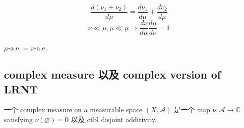 \[\frac{d(\nu_{1} + \nu_{2})}{d\mu} = \frac{d\nu_{1}}{d\mu} + \frac{d\nu_{2}}{d\mu}\]\[\nu \ll \mu,\mu \ll \mu\Longrightarrow\frac{d\nu}{d\mu}\frac{d\mu}{d\nu} = 1\]

\(\mu\)-a.e. = \(\nu\)-a.e.

\subsection{complex measure 以及 complex version of LRNT}\label{complex-measure-ux4ee5ux53ca-complex-version-of-lrnt}

\begin{definition}{}

一个 complex measure on a measurable space \((X,\mathcal{A})\) 是一个 map \(\nu:\mathcal{A}\rightarrow\mathbb{C}\) satisfying \(\nu(\varnothing) = 0\) 以及 ctbl disjoint additivity.

\end{definition}

